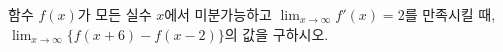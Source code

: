 함수 $f(x)$가 모든 실수 $x$에서 미분가능하고 $\displaystyle\lim_{x\to\infty} f'(x)=2$를 만족시킬 때, $\displaystyle\lim_{x\to\infty}\{f(x+6)-f(x-2)\}$의 값을 구하시오.
